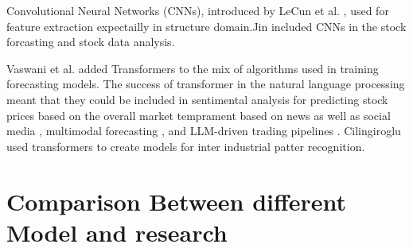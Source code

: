 Convolutional Neural Networks (CNNs), introduced by LeCun et al. \cite{LeCun1998CNN}, used for feature extraction expectailly in structure domain.Jin \cite{Jin2024CNNStockMarket} included CNNs in the stock forcasting and stock data analysis.

Vaswani et al. \cite{Vaswani2017Attention} added Transformers to the mix of algorithms used in training forecasting models. The success of transformer in the natural language processing meant that they could be included in sentimental analysis for predicting stock prices based on the overall market temprament based on news as well as social media \cite{Khanpuri2024SentimentAnalysis}, multimodal forecasting \cite{Huang2025DeepLearning}, and LLM-driven trading pipelines \cite{Cao2024LLMStock}. Cilingiroglu \cite{Cilingiroglu2025SentimentChangingPrice} used transformers to create models for inter industrial patter recognition.

\FloatBarrier
\section{Comparison Between different Model and research}

